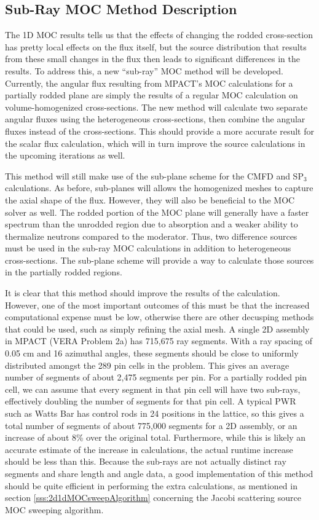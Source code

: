 \subsection{Sub-Ray MOC Method Description}

The 1D MOC results tells us that the effects of changing the rodded cross-section has pretty local effects on the flux itself, but the source distribution that results from these small changes in the flux then leads to significant differences in the results.  To address this, a new ``sub-ray'' MOC method will be developed.  Currently, the angular flux resulting from MPACT's MOC calculations for a partially rodded plane are simply the results of a regular MOC calculation on volume-homogenized cross-sections.  The new method will calculate two separate angular fluxes using the heterogeneous cross-sections, then combine the angular fluxes instead of the cross-sections.  This should provide a more accurate result for the scalar flux calculation, which will in turn improve the source calculations in the upcoming iterations as well.

This method will still make use of the sub-plane scheme for the CMFD and SP$_3$ calculations.  As before, sub-planes will allows the homogenized meshes to capture the axial shape of the flux.  However, they will also be beneficial to the MOC solver as well.  The rodded portion of the MOC plane will generally have a faster spectrum than the unrodded region due to absorption and a weaker ability to thermalize neutrons compared to the moderator.  Thus, two difference sources must be used in the sub-ray MOC calculations in addition to heterogeneous cross-sections.  The sub-plane scheme will provide a way to calculate those sources in the partially rodded regions.

It is clear that this method should improve the results of the calculation.  However, one of the most important outcomes of this must be that the increased computational expense must be low, otherwise there are other decusping methods that could be used, such as simply refining the axial mesh.  A single 2D assembly in MPACT (VERA Problem 2a) has 715,675 ray segments.  With a ray spacing of 0.05 cm and 16 azimuthal angles, these segments should be close to uniformly distributed amongst the 289 pin cells in the problem.  This gives an average number of segments of about 2,475 segments per pin.  For a partially rodded pin cell, we can assume that every segment in that pin cell will have two sub-rays, effectively doubling the number of segments for that pin cell.  A typical PWR such as Watts Bar has control rods in 24 positions in the lattice, so this gives a total number of segments of about 775,000 segments for a 2D assembly, or an increase of about 8\% over the original total.  Furthermore, while this is likely an accurate estimate of the increase in calculations, the actual runtime increase should be less than this.  Because the sub-rays are not actually distinct ray segments and share length and angle data, a good implementation of this method should be quite efficient in performing the extra calculations, as mentioned in section \ref{sss:2d1dMOCsweepAlgorithm} concerning the Jacobi scattering source MOC sweeping algorithm.

